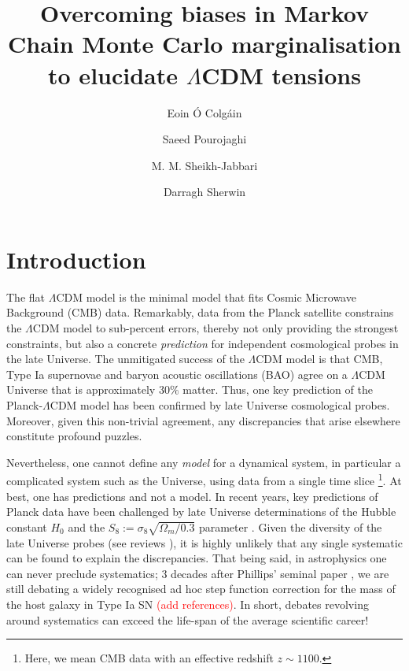 \documentclass[a4paper,11pt]{article}
\title{\boldmath Overcoming biases in Markov Chain Monte Carlo marginalisation to elucidate $\Lambda$CDM tensions }
\author[a,1]{Eoin \'O Colg\'ain}
\author[b]{Saeed Pourojaghi}
\author[b, c]{M. M. Sheikh-Jabbari}
\author[a]{Darragh Sherwin}
\affiliation[a]{Atlantic Technological University, Ash Lane, Sligo, Ireland}
\affiliation[b]{School of Physics, Institute for Research in Fundamental Sciences (IPM), P.O.Box 19395-5531, Tehran, Iran}
\affiliation[c]{ICTP...}
\def\red{\textcolor{red}}
\begin{document}
\maketitle
\flushbottom

\section{Introduction}
\label{sec:intro}
The flat $\Lambda$CDM model is the minimal model that fits Cosmic Microwave Background (CMB) data. Remarkably, data from the Planck satellite \cite{Planck:2018vyg} constrains the $\Lambda$CDM model to sub-percent errors, thereby not only providing the strongest constraints, but also a concrete \textit{prediction} for independent cosmological probes in the late Universe. The unmitigated success of the $\Lambda$CDM model is that CMB, Type Ia supernovae \cite{Riess:1998cb, Perlmutter:1998np} and baryon acoustic oscillations (BAO) \cite{Eisenstein:2005su} agree on a $\Lambda$CDM Universe that is approximately $30 \%$ matter. Thus, one key prediction of the Planck-$\Lambda$CDM model has been confirmed by late Universe cosmological probes. Moreover, given this non-trivial agreement, any discrepancies that arise elsewhere constitute profound puzzles. 

Nevertheless, one cannot define any \textit{model} for a dynamical system, in particular a complicated system such as the Universe, using data from a single time slice \footnote{Here, we mean CMB data with an effective redshift $z \sim 1100$.}. At best, one has predictions and not a model. In recent years, key predictions of Planck data have been challenged by late Universe determinations of the Hubble constant $H_0$ \cite{Riess:2021jrx, Freedman:2021ahq, Pesce:2020xfe, Blakeslee:2021rqi, Kourkchi:2020iyz} and the $S_8:= \sigma_8 \sqrt{\Omega_m/0.3}$ parameter \cite{HSC:2018mrq, KiDS:2020suj, DES:2021wwk, Boruah:2019icj, Said:2020epb}. Given the diversity of the late Universe probes (see reviews \cite{Perivolaropoulos:2021jda, Abdalla:2022yfr}), it is highly unlikely that any single systematic can be found to explain the discrepancies. That being said, in astrophysics one can never preclude systematics; 3 decades after Phillips' seminal paper \cite{Phillips:1993ng}, we are still debating a widely recognised ad hoc step function correction for the mass of the host galaxy in Type Ia SN \cite{} \red{(add references)}. In short, debates revolving around systematics can exceed the life-span of the average scientific career! 
\end{document}
